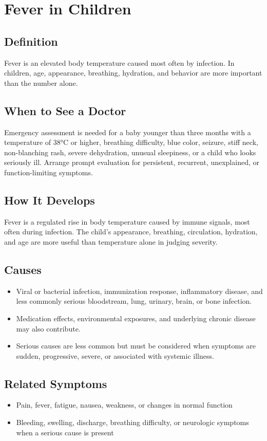 \chapter{Fever in Children}

\section*{Definition}
Fever is an elevated body temperature caused most often by infection. In children, age, appearance, breathing, hydration, and behavior are more important than the number alone.

\section*{When to See a Doctor}
Emergency assessment is needed for a baby younger than three months with a temperature of 38°C or higher, breathing difficulty, blue color, seizure, stiff neck, non-blanching rash, severe dehydration, unusual sleepiness, or a child who looks seriously ill. Arrange prompt evaluation for persistent, recurrent, unexplained, or function-limiting symptoms.

\section*{How It Develops}
Fever is a regulated rise in body temperature caused by immune signals, most often during infection. The child's appearance, breathing, circulation, hydration, and age are more useful than temperature alone in judging severity.

\section*{Causes}
\begin{itemize}
  \item Viral or bacterial infection, immunization response, inflammatory disease, and less commonly serious bloodstream, lung, urinary, brain, or bone infection.
  \item Medication effects, environmental exposures, and underlying chronic disease may also contribute.
  \item Serious causes are less common but must be considered when symptoms are sudden, progressive, severe, or associated with systemic illness.
\end{itemize}

\section*{Related Symptoms}
\begin{itemize}
  \item Pain, fever, fatigue, nausea, weakness, or changes in normal function
  \item Bleeding, swelling, discharge, breathing difficulty, or neurologic symptoms when a serious cause is present
\end{itemize}

